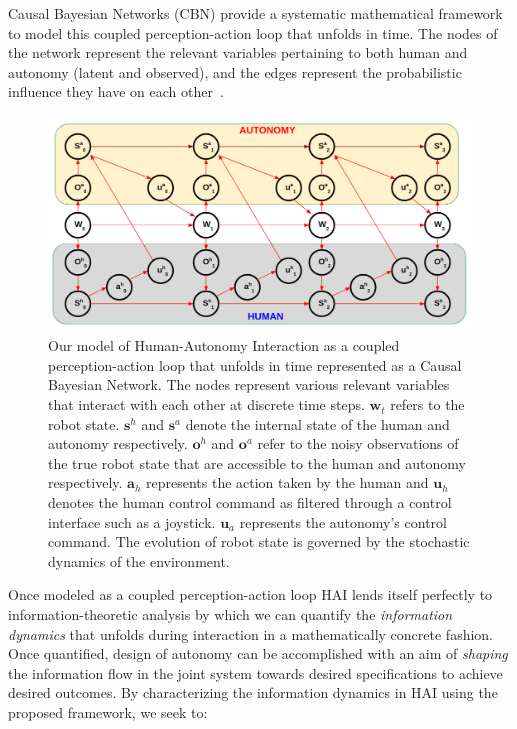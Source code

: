 \documentclass[12pt]{article}
\begin{document}
Causal Bayesian Networks (CBN) provide a systematic mathematical framework to model this coupled perception-action loop that unfolds in time. The nodes of the network represent the relevant variables pertaining to both human and autonomy (latent and observed), and the edges represent the probabilistic influence they have on each other~\cite{pearl2009causality}. 
\begin{figure}[t!]
	\includegraphics[keepaspectratio, width = 1\textwidth, center]{./figures/pa_loop.png}
	\caption{Our model of Human-Autonomy Interaction as a coupled perception-action loop that unfolds in time represented as a Causal Bayesian Network. The nodes represent various relevant variables that interact with each other at discrete time steps. $\textbf{w}_t$ refers to the robot state. $\textbf{s}^h$ and $\textbf{s}^a$ denote the internal state of the human and autonomy respectively. $\textbf{o}^h$ and $\textbf{o}^a$ refer to the noisy observations of the true robot state that are accessible to the human and autonomy respectively. $\textbf{a}_h$ represents the action taken by the human and $\textbf{u}_h$ denotes the human control command as filtered through a control interface such as a joystick. $\textbf{u}_a$ represents the autonomy's control command. The evolution of robot state is governed by the stochastic dynamics of the environment.}
	\label{fig:cbn}
\end{figure}
Once modeled as a coupled perception-action loop HAI lends itself perfectly to information-theoretic analysis by which we can quantify the \textit{information dynamics} that unfolds during interaction in a mathematically concrete fashion. Once quantified, design of autonomy can be accomplished with an aim of \textit{shaping} the information flow in the joint system towards desired specifications to achieve desired outcomes.  By characterizing the information dynamics in HAI using the proposed framework, we seek to:
\end{document}
